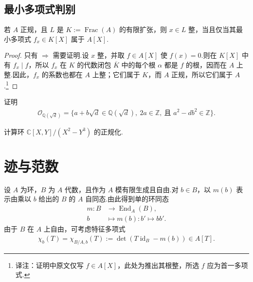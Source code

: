 \subsection{最小多项式判别}\label{sec:nt-2-2-6}
\begin{proposition*}
若 $A$ 正规，且 $L$ 是 $K:=\operatorname{Frac}(A)$ 的有限扩张，则 $x\in L$ 整，当且仅当其最小多项式 $f_x\in K[X]$ 属于 $A[X]$.
\end{proposition*}
\begin{proof}
只有 $\Rightarrow$ 需要证明.设 $x$ 整，并取 $f\in A[X]$ 使 $f(x)=0$.则在 $K[X]$ 中有 $f_x\mid f$，所以 $f_x$ 在 $K$ 的代数闭包 $\overline K$ 中的每个根 $\alpha$ 都是 $f$ 的根，因而在 $A$ 上整.因此，$f_x$ 的系数也都在 $A$ 上整；它们属于 $K$，而 $A$ 正规，所以它们属于 $A$.\footnote{译注：证明中原文仅写 $f\in A[X]$，此处为推出其根整，所选 $f$ 应为首一多项式.}
\end{proof}
\begin{exercise*}
证明
\begin{align*}
\mathcal O_{\mathbb Q(\sqrt d)}=\{a+b\sqrt d\in\mathbb Q(\sqrt d),\ 2a\in\mathbb Z,\ \text{且 }a^2-db^2\in\mathbb Z\}.
\end{align*}
\end{exercise*}
\begin{exercise*}
计算环 $\mathbb C[X,Y]/(X^2-Y^3)$ 的正规化.
\end{exercise*}

\section{迹与范数}\label{sec:nt-2-3}
设 $A$ 为环，$B$ 为 $A$ 代数，且作为 $A$ 模有限生成且自由.对 $b\in B$，以 $m(b)$ 表示由乘以 $b$ 给出的 $B$ 的 $A$ 自同态.由此得到单的环同态
\begin{align*}
m:B&\longrightarrow\operatorname{End}_A(B),\\
b&\longmapsto m(b):b'\longmapsto bb'.
\end{align*}
由于 $B$ 在 $A$ 上自由，可考虑特征多项式
\begin{align*}
\chi_b(T)=\chi_{B/A,b}(T):=\det(T\operatorname{id}_B-m(b))\in A[T].
\end{align*}
